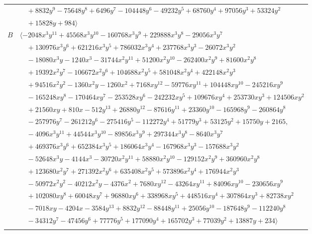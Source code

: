 \documentclass[11pt]{article}
\begin{document}
\begin{longtable}{@{}ll@{}}
 & $\quad +8832y^{9}-75648y^{8}+6496y^{7}-104448y^{6}-49232y^{5}+68760y^{4}+97056y^{3}+53324y^{2}$\\
 & $\quad +15828y+984\rangle$\\
$B$ & $\langle -2048x^{3}y^{11}+45568x^{3}y^{10}-160768x^{3}y^{9}+229888x^{3}y^{8}-29056x^{3}y^{7}$\\
 & $\quad +130976x^{3}y^{6}+621216x^{3}y^{5}+786032x^{3}y^{4}+237768x^{3}y^{3}-26072x^{3}y^{2}$\\
 & $\quad -18080x^{3}y-1240x^{3}-31744x^{2}y^{11}+51200x^{2}y^{10}-262400x^{2}y^{9}+81600x^{2}y^{8}$\\
 & $\quad +19392x^{2}y^{7}-106672x^{2}y^{6}+104688x^{2}y^{5}+581048x^{2}y^{4}+422148x^{2}y^{3}$\\
 & $\quad +94516x^{2}y^{2}-1360x^{2}y-1260x^{2}+7168xy^{12}-59776xy^{11}+104448xy^{10}-245216xy^{9}$\\
 & $\quad -165248xy^{8}-170464xy^{7}-253528xy^{6}-242232xy^{5}+109676xy^{4}+253730xy^{3}+124506xy^{2}$\\
 & $\quad +21560xy+810x-512y^{13}+26880y^{12}-87616y^{11}+23360y^{10}-165968y^{9}-260864y^{8}$\\
 & $\quad -257976y^{7}-261212y^{6}-275416y^{5}-112272y^{4}+51779y^{3}+53125y^{2}+15750y+2165,$\\
 & $\quad -4096x^{3}y^{11}+44544x^{3}y^{10}-89856x^{3}y^{9}+297344x^{3}y^{8}-8640x^{3}y^{7}$\\
 & $\quad +469376x^{3}y^{6}+652384x^{3}y^{5}+186064x^{3}y^{4}-167968x^{3}y^{3}-157688x^{3}y^{2}$\\
 & $\quad -52648x^{3}y-4144x^{3}-30720x^{2}y^{11}+58880x^{2}y^{10}-129152x^{2}y^{9}+360960x^{2}y^{8}$\\
 & $\quad +123680x^{2}y^{7}+271392x^{2}y^{6}+635408x^{2}y^{5}+573896x^{2}y^{4}+176944x^{2}y^{3}$\\
 & $\quad -50972x^{2}y^{2}-40212x^{2}y-4376x^{2}+7680xy^{12}-43264xy^{11}+84096xy^{10}-230656xy^{9}$\\
 & $\quad +102080xy^{8}+60048xy^{7}+96880xy^{6}+338968xy^{5}+448516xy^{4}+307864xy^{3}+82738xy^{2}$\\
 & $\quad -7018xy-4204x-3584y^{13}+8832y^{12}-88448y^{11}+25056y^{10}-187648y^{9}-112240y^{8}$\\
 & $\quad -34312y^{7}-47456y^{6}+77776y^{5}+177090y^{4}+165702y^{3}+77039y^{2}+13887y+234\rangle$\\
\addlinespace[2pt]
\multicolumn{2}{@{}p{0.97\textwidth}@{}}{$i=47$, $D_i=1$, $\rho_{ij}$: $27{:}1, \allowbreak 41{:}1, \allowbreak 59{:}1, \allowbreak 63{:}2$}\\

\end{longtable}
\end{document}
